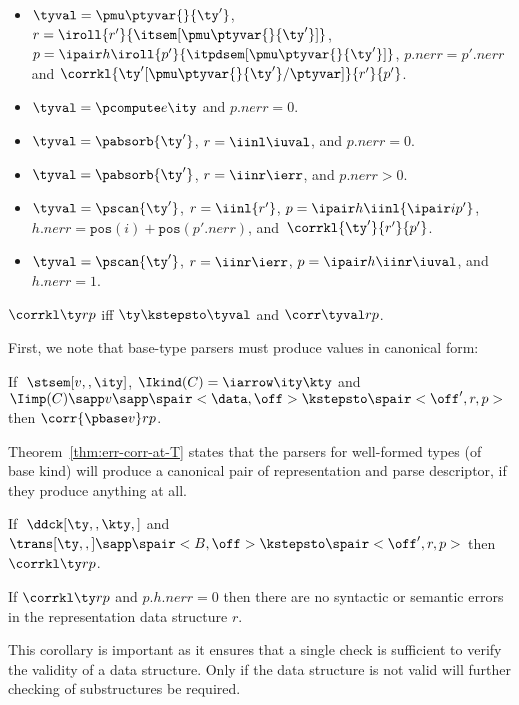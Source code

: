 \begin{definition}
\begin{itemize}
  \item $\tyval = \pmu \ptyvar {} {\ty'}$, 
    $r = \iroll{r'}{\itsem[\pmu \ptyvar {} {\ty'}]}$, $p =
    \ipair h {\iroll{p'}{
                \itpdsem[\pmu \ptyvar {} {\ty'}]}}$, 
        $p.{nerr} = p'.{nerr}$ 
    and \linebreak
    $\corrkl {\ty'[\pmu \ptyvar {} {\ty'}/\ptyvar]} {r'} {p'}$.
  \item $\tyval = \pcompute e \ity$ and $p.{nerr} = 0$.
  \item $\tyval = \pabsorb {\ty'}$, $r = \iinl \iuval$, and $p.nerr = 0$.
  \item $\tyval = \pabsorb {\ty'}$, $r = \iinr \ierr$, and $p.nerr > 0$.
  \item $\tyval = \pscan {\ty'}$, $r =\iinl {r'}$,
      $p = \ipair h {\iinl {\ipair i {p'}}}$,
      $h.nerr = \mathtt{pos}(i) + \mathtt{pos}(p'.nerr)$, and \linebreak
      $\, \corrkl {\ty'}{r'}{p'}$.
  \item $\tyval = \pscan {\ty'}$,
      $r =\iinr \ierr$,
      $p = \ipair h {\iinr \iuval}$, and
      $h.{nerr} = 1$.
  \end{itemize}
\end{definition}

\begin{definition}
$\corrkl \ty r p$ iff $\ty \kstepsto \tyval$ and $\corr \tyval r p$.
\end{definition}

First, we note that base-type parsers must produce values in canonical form:
\begin{condition}
  If $\;\stsem[v,,\ity]$, $\Ikind(C) = \iarrow \ity \kty$ and $\Iimp(C)
  \sapp v \sapp \spair<\data,\off> \kstepsto \spair<\off',r,p>$ then
  $\corr {\pbase v} r p $.
\end{condition}

Theorem~\ref{thm:err-corr-at-T} states that the parsers for
well-formed types (of base kind) will produce a canonical pair of
representation and parse descriptor, if they produce anything at all.

\begin{theorem}
\label{thm:err-corr-at-T}
If $\; \ddck[\ty,,\kty,]$ and $\trans[\ty,,] \sapp \spair<B,\off> \kstepsto
  \spair<\off',r,p>$ then $\corrkl \ty r p$.
\end{theorem}

\begin{corollary}
  If $\corrkl \ty r p$ and $p.h.nerr = 0$ then there are no syntactic
  or semantic errors in the representation data structure $r$.
\end{corollary}

This corollary is important as it ensures that a single check is
sufficient to verify the validity of a data structure. Only if the
data structure is not valid will further checking of substructures be
required.

